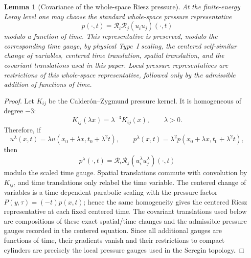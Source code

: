 \documentclass[11pt]{amsart}
\numberwithin{equation}{section}
\theoremstyle{plain}
\newtheorem{lemma}[lemma]{Lemma}
\theoremstyle{definition}
\theoremstyle{remark}
\begin{document}
\begin{lemma}[Covariance of the whole-space Riesz pressure]
\label{lem:whole-space-riesz-pressure-covariance}
At the finite-energy Leray level one may choose the standard whole-space
pressure representative
\[
   p(\cdot,t)=\mathcal R_i\mathcal R_j(u_i u_j)(\cdot,t)
\]
modulo a function of time.  This representative is preserved, modulo the
corresponding time gauge, by physical Type~I scaling, the centered
self-similar change of variables, centered time translation, spatial
translation, and the covariant translations used in this paper.  Local pressure
representatives are restrictions of this whole-space representative, followed
only by the admissible addition of functions of time.
\end{lemma}

\begin{proof}
Let \(K_{ij}\) be the Calder\'on--Zygmund pressure kernel.  It is homogeneous of
degree \(-3\):
\[
   K_{ij}(\lambda x)=\lambda^{-3}K_{ij}(x),\qquad \lambda>0 .
\]
Therefore, if
\[
   u^\lambda(x,t)=\lambda u(x_0+\lambda x,t_0+\lambda^2t),
   \qquad
   p^\lambda(x,t)=\lambda^2p(x_0+\lambda x,t_0+\lambda^2t),
\]
then
\[
   p^\lambda(\cdot,t)
   =
   \mathcal R_i\mathcal R_j
   (u^\lambda_i u^\lambda_j)(\cdot,t)
\]
modulo the scaled time gauge.  Spatial translations commute with convolution by
\(K_{ij}\), and time translations only relabel the time variable.  The centered
change of variables is a time-dependent parabolic scaling with the
pressure factor \(P(y,\tau)=(-t)p(x,t)\); hence the same homogeneity gives the
centered Riesz representative at each fixed centered time.  The covariant
translations used below are compositions of these exact spatial/time changes
and the admissible pressure gauges recorded in the centered equation.  Since
all additional gauges are functions of time, their gradients vanish and their
restrictions to compact cylinders are precisely the local pressure gauges used
in the Seregin topology.
\end{proof}
\end{document}
